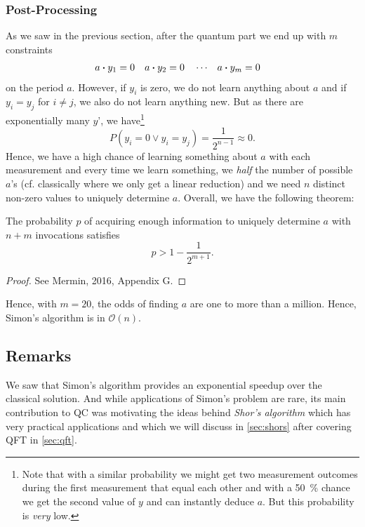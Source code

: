 			\subsubsection{Post-Processing}
				As we saw in the previous section, after the quantum part we end up with \(m\) constraints
				\begin{align}
					a \dotproduct y_1 & = 0    &
					a \dotproduct y_2 & = 0    &
					                  & \cdots &
					a \dotproduct y_m & = 0
				\end{align}
				on the period \(a\). However, if \(y_i\) is zero, we do not learn anything about \(a\) and if \(y_i = y_j\) for \(i \neq j\), we also do not learn anything new. But as there are exponentially many \(y\)', we have\footnote{Note that with a similar probability we might get two measurement outcomes during the first measurement that equal each other and with a \SI{50}{\percent} chance we get the second value of \(y\) and can instantly deduce \(a\). But this probability is \emph{very} low.}
				\begin{equation}
					P(y_i = 0 \lor y_i = y_j) = \frac{1}{2^{n - 1}} \approx 0.
				\end{equation}
				Hence, we have a high chance of learning something about \(a\) with each measurement and every time we learn something, we \emph{half} the number of possible \(a\)'s (cf. classically where we only get a linear reduction) and we need \(n\) distinct non-zero values to uniquely determine \(a\). Overall, we have the following theorem:

				\begin{theorem}
					The probability \(p\) of acquiring enough information to uniquely determine \(a\) with \(n + m\) invocations satisfies
					\begin{equation}
						p > 1 - \frac{1}{2^{m + 1}}.
					\end{equation}
				\end{theorem}
				\begin{proof}
					See Mermin, 2016, Appendix G.
				\end{proof}

				Hence, with \(m = 20\), the odds of finding \(a\) are one to more than a million. Hence, Simon's algorithm is in \( \mathcal{O}(n) \).

		\subsection{Remarks}
			We saw that Simon's algorithm provides an exponential speedup over the classical solution. And while applications of Simon's problem are rare, its main contribution to \ac{QC} was motivating the ideas behind \emph{Shor's algorithm} which has very practical applications and which we will discuss in \autoref{sec:shors} after covering \ac{QFT} in \autoref{sec:qft}.

